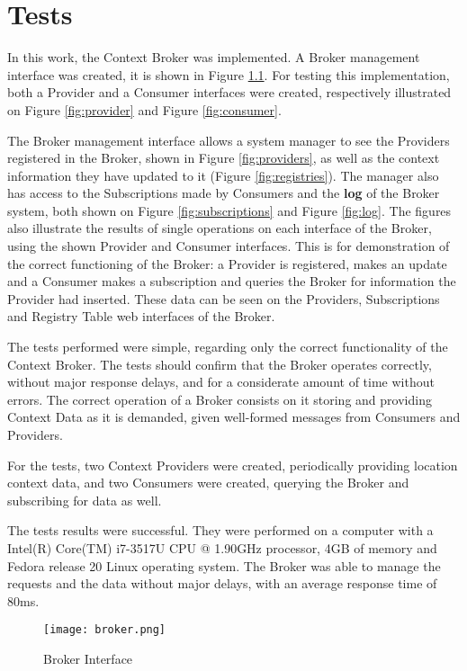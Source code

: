 \chapter{Tests}
\label{chap:tests}
In this work, the Context Broker was implemented. A Broker management interface was created, it is shown in Figure \ref{fig:broker}. For testing this implementation, both a Provider and a Consumer interfaces were created, respectively illustrated on Figure \ref{fig:provider} and Figure \ref{fig:consumer}.

The Broker management interface allows a system manager to see the Providers registered in the Broker, shown in Figure \ref{fig:providers}, as well as the context information they have updated to it (Figure \ref{fig:registries}). The manager also has access to the Subscriptions made by Consumers and the \textbf{log} of the Broker system, both shown on Figure \ref{fig:subscriptions} and Figure \ref{fig:log}. The figures also illustrate the results of single operations on each interface of the Broker, using the shown Provider and Consumer interfaces. This is for demonstration of the correct functioning of the Broker: a Provider is registered, makes an update and a Consumer makes a subscription and queries the Broker for information the Provider had inserted. These data can be seen on the Providers, Subscriptions and Registry Table web interfaces of the Broker.


The tests performed were simple, regarding only the correct functionality of the Context Broker. The tests should confirm that the Broker operates correctly, without major response delays, and for a considerate amount of time without errors. The correct operation of a Broker consists on it storing and providing Context Data as it is demanded, given well-formed messages from Consumers and Providers.

For the tests, two Context Providers were created, periodically providing location context data, and two Consumers were created, querying the Broker and subscribing for data as well.

The tests results were successful. They were performed on a computer with a Intel(R) Core(TM) i7-3517U CPU @ 1.90GHz processor, 4GB of memory and Fedora release 20 Linux operating system. The Broker was able to manage the requests and the data without major delays, with an average response time of 80ms. 

\begin{figure}[h]
	\centering
	\texttt{[image: broker.png]}
	\caption{Broker Interface}
	\label{fig:broker}
	
\end{figure}

